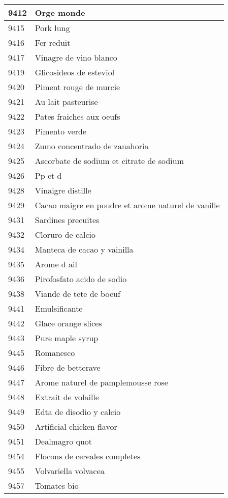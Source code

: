 \begin{longtable}{|l|l|}
9412 & Orge monde \\ \hline 
9415 & Pork lung \\ \hline 
9416 & Fer reduit \\ \hline 
9417 & Vinagre de vino blanco \\ \hline 
9419 & Glicosideos de esteviol \\ \hline 
9420 & Piment rouge de murcie \\ \hline 
9421 & Au lait pasteurise \\ \hline 
9422 & Pates fraiches aux oeufs \\ \hline 
9423 & Pimento verde \\ \hline 
9424 & Zumo concentrado de zanahoria \\ \hline 
9425 & Ascorbate de sodium et citrate de sodium \\ \hline 
9426 & Pp et d \\ \hline 
9428 & Vinaigre distille \\ \hline 
9429 & Cacao maigre en poudre et arome naturel de vanille \\ \hline 
9431 & Sardines precuites \\ \hline 
9432 & Cloruro de calcio \\ \hline 
9434 & Manteca de cacao y vainilla \\ \hline 
9435 & Arome d ail \\ \hline 
9436 & Pirofosfato acido de sodio \\ \hline 
9438 & Viande de tete de boeuf \\ \hline 
9441 & Emulsificante \\ \hline 
9442 & Glace orange slices \\ \hline 
9443 & Pure maple syrup \\ \hline 
9445 & Romanesco \\ \hline 
9446 & Fibre de betterave \\ \hline 
9447 & Arome naturel de pamplemousse rose \\ \hline 
9448 & Extrait de volaille \\ \hline 
9449 & Edta de disodio y calcio \\ \hline 
9450 & Artificial chicken flavor \\ \hline 
9451 & Dealmagro quot \\ \hline 
9454 & Flocons de cereales completes \\ \hline 
9455 & Volvariella volvacea \\ \hline 
9457 & Tomates bio \\ \hline 

\end{longtable}
